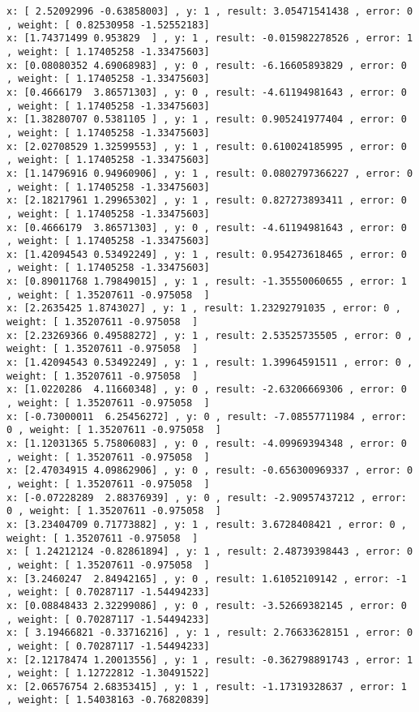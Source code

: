 \documentclass[11pt]{article}
\begin{document}
\begin{Verbatim}[commandchars=\\\{\}]
x: [ 2.52092996 -0.63858003] , y: 1 , result: 3.05471541438 , error: 0 , weight: [ 0.82530958 -1.52552183]
x: [1.74371499 0.953829  ] , y: 1 , result: -0.015982278526 , error: 1 , weight: [ 1.17405258 -1.33475603]
x: [0.08080352 4.69068983] , y: 0 , result: -6.16605893829 , error: 0 , weight: [ 1.17405258 -1.33475603]
x: [0.4666179  3.86571303] , y: 0 , result: -4.61194981643 , error: 0 , weight: [ 1.17405258 -1.33475603]
x: [1.38280707 0.5381105 ] , y: 1 , result: 0.905241977404 , error: 0 , weight: [ 1.17405258 -1.33475603]
x: [2.02708529 1.32599553] , y: 1 , result: 0.610024185995 , error: 0 , weight: [ 1.17405258 -1.33475603]
x: [1.14796916 0.94960906] , y: 1 , result: 0.0802797366227 , error: 0 , weight: [ 1.17405258 -1.33475603]
x: [2.18217961 1.29965302] , y: 1 , result: 0.827273893411 , error: 0 , weight: [ 1.17405258 -1.33475603]
x: [0.4666179  3.86571303] , y: 0 , result: -4.61194981643 , error: 0 , weight: [ 1.17405258 -1.33475603]
x: [1.42094543 0.53492249] , y: 1 , result: 0.954273618465 , error: 0 , weight: [ 1.17405258 -1.33475603]
x: [0.89011768 1.79849015] , y: 1 , result: -1.35550060655 , error: 1 , weight: [ 1.35207611 -0.975058  ]
x: [2.2635425 1.8743027] , y: 1 , result: 1.23292791035 , error: 0 , weight: [ 1.35207611 -0.975058  ]
x: [2.23269366 0.49588272] , y: 1 , result: 2.53525735505 , error: 0 , weight: [ 1.35207611 -0.975058  ]
x: [1.42094543 0.53492249] , y: 1 , result: 1.39964591511 , error: 0 , weight: [ 1.35207611 -0.975058  ]
x: [1.0220286  4.11660348] , y: 0 , result: -2.63206669306 , error: 0 , weight: [ 1.35207611 -0.975058  ]
x: [-0.73000011  6.25456272] , y: 0 , result: -7.08557711984 , error: 0 , weight: [ 1.35207611 -0.975058  ]
x: [1.12031365 5.75806083] , y: 0 , result: -4.09969394348 , error: 0 , weight: [ 1.35207611 -0.975058  ]
x: [2.47034915 4.09862906] , y: 0 , result: -0.656300969337 , error: 0 , weight: [ 1.35207611 -0.975058  ]
x: [-0.07228289  2.88376939] , y: 0 , result: -2.90957437212 , error: 0 , weight: [ 1.35207611 -0.975058  ]
x: [3.23404709 0.71773882] , y: 1 , result: 3.6728408421 , error: 0 , weight: [ 1.35207611 -0.975058  ]
x: [ 1.24212124 -0.82861894] , y: 1 , result: 2.48739398443 , error: 0 , weight: [ 1.35207611 -0.975058  ]
x: [3.2460247  2.84942165] , y: 0 , result: 1.61052109142 , error: -1 , weight: [ 0.70287117 -1.54494233]
x: [0.08848433 2.32299086] , y: 0 , result: -3.52669382145 , error: 0 , weight: [ 0.70287117 -1.54494233]
x: [ 3.19466821 -0.33716216] , y: 1 , result: 2.76633628151 , error: 0 , weight: [ 0.70287117 -1.54494233]
x: [2.12178474 1.20013556] , y: 1 , result: -0.362798891743 , error: 1 , weight: [ 1.12722812 -1.30491522]
x: [2.06576754 2.68353415] , y: 1 , result: -1.17319328637 , error: 1 , weight: [ 1.54038163 -0.76820839]

    \end{Verbatim}
\end{document}
